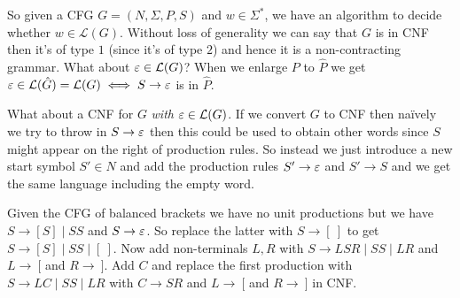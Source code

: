 \documentclass[tikx, border = 10pt]{article}
\begin{document}
\par
So given a CFG $ G = (N,\Sigma, P,S) $ and $ w\in \Sigma^* $, we have an algorithm to decide whether $ w\in \mathcal L(G) $. Without loss of generality we can say that $ G $ is in CNF then it's of type $ 1 $ (since it's of type $ 2 $) and hence it is a non-contracting grammar. What about $ \varepsilon \in \mathcal L(G) $? When we enlarge $ P $ to $ \hat P $ we get $ \varepsilon \in \mathcal L(\hat G) = \mathcal L(G) \iff S \to \varepsilon $ is in $ \hat P $.\par
What about a CNF for $ G $ \textit{with} $ \varepsilon \in \mathcal L(G) $. If we convert $ G $ to CNF then na\"ively we try to throw in $ S\to \varepsilon $ then this could be used to obtain other words since $ S $ might appear on the right of production rules. So instead we just introduce a new start symbol $ S'\in N $ and add the production rules $ S'\to \varepsilon $ and $ S' \to S $ and we get the same language including the empty word.
\begin{example}
	Given the CFG of balanced brackets we have no unit productions but we have $ S \to [S] \mid SS $ and $ S \to\varepsilon $. So replace the latter with $ S \to [\:] $ to get $ S \to [S]\mid SS\mid [\:] $. Now add non-terminals $ L,R $ with $ S \to LSR \mid SS\mid LR $ and $ L \to\: [ $ and $ R \to\: ] $. Add $ C $ and replace the first production with $ S \to LC \mid SS\mid LR $ with $ C \to SR $ and $ L \to\: [ $ and $ R \to \:] $ in CNF. 
\end{example}
\end{document}

